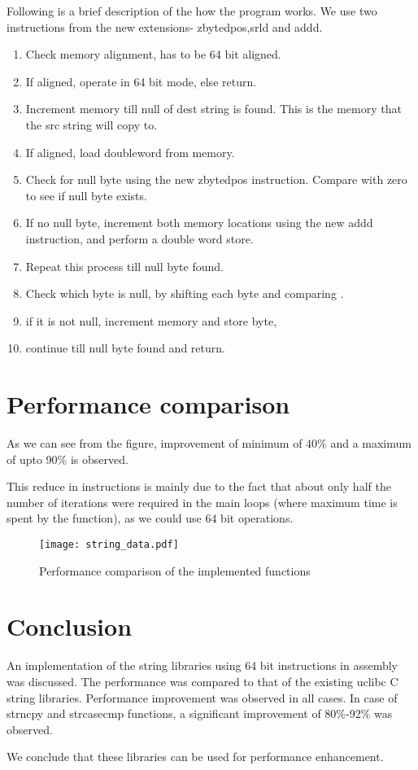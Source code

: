 \documentclass[12pt]{article}
\begin{document}
Following is a brief description of the how the program works. We use two instructions from the new extensions- zbytedpos,srld and addd. 


\begin{enumerate}
    \item Check memory alignment, has to be 64 bit aligned.
    \item If aligned, operate in 64 bit mode, else return.
    \item Increment memory till null of dest string is found. This is the memory that the src string will copy to.
    \item If aligned, load doubleword from memory.
    \item Check for null byte using the new zbytedpos instruction. Compare with zero to see if null byte exists.
    \item If no null byte, increment both memory locations using the new addd instruction, and perform a double word store.
    \item Repeat this process till null byte found.
    \item Check which byte is null, by shifting each byte and comparing .
    \item if it is not null, increment memory and store byte,
    \item continue till null byte found and return.
\end{enumerate}

\section{Performance comparison}
As we can see from the figure, improvement of minimum of 40\% and a maximum of upto 90\% is observed.


This reduce in instructions is mainly due to the fact that about only half the number of iterations were required in the main loops (where maximum time is spent by the function), as we could use 64 bit operations.

\begin{figure}[htbp]
 \hbox{\hspace{-7cm}\texttt{[image: string\_data.pdf]}}
    \caption{Performance comparison of the implemented functions} 
    \label{Fig 1}
\end{figure}
\newpage

\section{Conclusion}
An implementation of the string libraries using 64 bit instructions in assembly was discussed. The performance was compared to that of the existing uclibc C string libraries.
\newline
Performance improvement was observed in all cases. In case of strncpy and strcasecmp functions, a 
significant improvement of 80\%-92\% was observed.
\newline

We conclude that these libraries can be used for performance enhancement.

 
\end{document}

